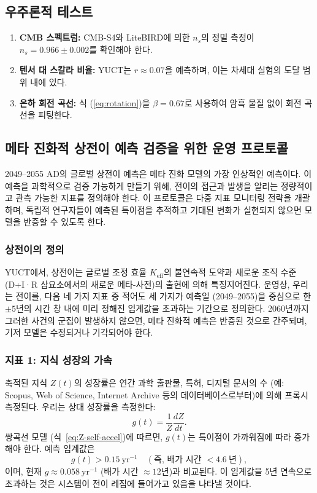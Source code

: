 \documentclass[12pt,a4paper]{article}
\theoremstyle{remark}
\begin{document}
	\subsection{우주론적 테스트}
	
	\begin{enumerate}
		\item \textbf{CMB 스펙트럼:} CMB-S4와 LiteBIRD에 의한 \(n_s\)의 정밀 측정이 \(n_s = 0.966 \pm 0.002\)를 확인해야 한다.
		\item \textbf{텐서 대 스칼라 비율:} YUCT는 \(r \approx 0.07\)을 예측하며, 이는 차세대 실험의 도달 범위 내에 있다.
		\item \textbf{은하 회전 곡선:} 식 (\ref{eq:rotation})을 \(\beta = 0.67\)로 사용하여 암흑 물질 없이 회전 곡선을 피팅한다.
	\end{enumerate}
	
	\subsection{메타 진화적 상전이 예측 검증을 위한 운영 프로토콜}
	\label{subsec:forecast-protocol}
	
	2049–2055 AD의 글로벌 상전이 예측은 메타 진화 모델의 가장 인상적인 예측이다. 이 예측을 과학적으로 검증 가능하게 만들기 위해, 전이의 접근과 발생을 알리는 정량적이고 관측 가능한 지표를 정의해야 한다. 이 프로토콜은 다중 지표 모니터링 전략을 개괄하며, 독립적 연구자들이 예측된 특이점을 추적하고 기대된 변화가 실현되지 않으면 모델을 반증할 수 있도록 한다.
	
	\subsubsection{상전이의 정의}
	
	YUCT에서, 상전이는 글로벌 조정 효율 \(K_{\text{eff}}\)의 불연속적 도약과 새로운 조직 수준 (D+I·R 삼요소에서의 새로운 메타-사전)의 출현에 의해 특징지어진다. 운영상, 우리는 전이를, 다음 네 가지 지표 중 적어도 세 가지가 예측일 (2049–2055)을 중심으로 한 \(\pm 5\)년의 시간 창 내에 미리 정해진 임계값을 초과하는 기간으로 정의한다. 2060년까지 그러한 사건의 군집이 발생하지 않으면, 메타 진화적 예측은 반증된 것으로 간주되며, 기저 모델은 수정되거나 기각되어야 한다.
	
	\subsubsection{지표 1: 지식 성장의 가속}
	
	축적된 지식 \(Z(t)\)의 성장률은 연간 과학 출판물, 특허, 디지털 문서의 수 (예: Scopus, Web of Science, Internet Archive 등의 데이터베이스로부터)에 의해 프록시 측정된다. 우리는 상대 성장률을 측정한다:
	\[
	g(t) = \frac{1}{Z}\frac{dZ}{dt}.
	\]
	쌍곡선 모델 (식~\ref{eq:Z-self-accel})에 따르면, \(g(t)\)는 특이점이 가까워짐에 따라 증가해야 한다. 예측 임계값은
	\[
	g(t) > 0.15\ \text{yr}^{-1} \quad (\text{즉, 배가 시간 } < 4.6\ \text{년}),
	\]
	이며, 현재 \(g\approx 0.058\ \text{yr}^{-1}\) (배가 시간 \(\approx 12\)년)과 비교된다. 이 임계값을 5년 연속으로 초과하는 것은 시스템이 전이 레짐에 들어가고 있음을 나타낼 것이다.
	
\end{document}
